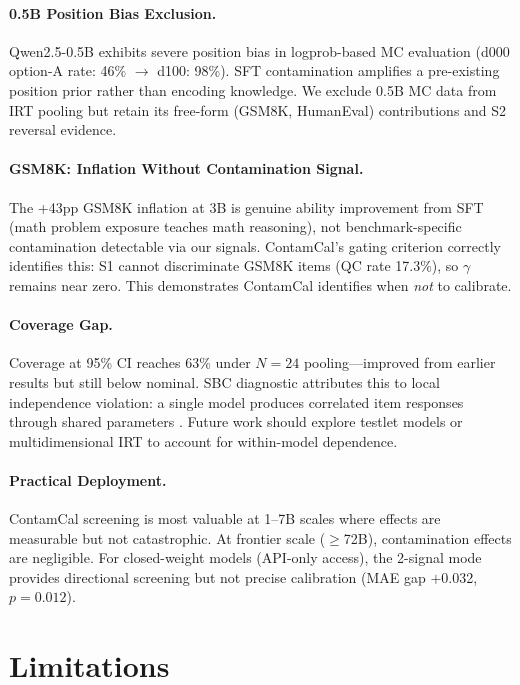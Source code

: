 \documentclass[11pt,a4paper]{article}
\newcommand{\gam}{\gamma}
\begin{document}
\paragraph{0.5B Position Bias Exclusion.}
Qwen2.5-0.5B exhibits severe position bias in logprob-based MC evaluation (d000 option-A rate: 46\% $\to$ d100: 98\%). SFT contamination amplifies a pre-existing position prior rather than encoding knowledge. We exclude 0.5B MC data from IRT pooling but retain its free-form (GSM8K, HumanEval) contributions and S2 reversal evidence.

\paragraph{GSM8K: Inflation Without Contamination Signal.}
The +43pp GSM8K inflation at 3B is genuine ability improvement from SFT (math problem exposure teaches math reasoning), not benchmark-specific contamination detectable via our signals. ContamCal's gating criterion correctly identifies this: S1 cannot discriminate GSM8K items (QC rate 17.3\%), so $\gam$ remains near zero. This demonstrates ContamCal identifies when \emph{not} to calibrate.

\paragraph{Coverage Gap.}
Coverage at 95\% CI reaches 63\% under $N{=}24$ pooling---improved from earlier results but still below nominal. SBC diagnostic attributes this to local independence violation: a single model produces correlated item responses through shared parameters \cite{mislevy1986bayes}. Future work should explore testlet models or multidimensional IRT \cite{reckase2009multidimensional} to account for within-model dependence.

\paragraph{Practical Deployment.}
ContamCal screening is most valuable at 1--7B scales where effects are measurable but not catastrophic. At frontier scale ($\geq$72B), contamination effects are negligible. For closed-weight models (API-only access), the 2-signal mode provides directional screening but not precise calibration (MAE gap $+$0.032, $p{=}0.012$).

\section{Limitations}
\end{document}
